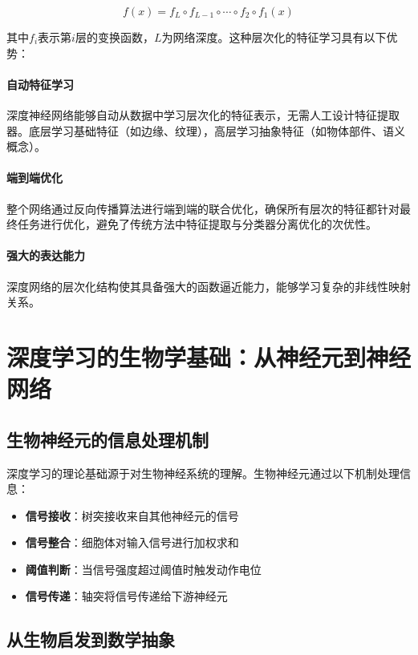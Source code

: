 \begin{equation}
f(x) = f_L \circ f_{L-1} \circ \cdots \circ f_2 \circ f_1(x)
\end{equation}

其中$f_i$表示第$i$层的变换函数，$L$为网络深度。这种层次化的特征学习具有以下优势：

\paragraph{自动特征学习}
深度神经网络能够自动从数据中学习层次化的特征表示，无需人工设计特征提取器。底层学习基础特征（如边缘、纹理），高层学习抽象特征（如物体部件、语义概念）。

\paragraph{端到端优化}
整个网络通过反向传播算法进行端到端的联合优化，确保所有层次的特征都针对最终任务进行优化，避免了传统方法中特征提取与分类器分离优化的次优性。

\paragraph{强大的表达能力}
深度网络的层次化结构使其具备强大的函数逼近能力，能够学习复杂的非线性映射关系。

\section{深度学习的生物学基础：从神经元到神经网络}

\subsection{生物神经元的信息处理机制}

深度学习的理论基础源于对生物神经系统的理解。生物神经元通过以下机制处理信息：

\begin{itemize}
\item {\bf 信号接收}：树突接收来自其他神经元的信号
\item {\bf 信号整合}：细胞体对输入信号进行加权求和
\item {\bf 阈值判断}：当信号强度超过阈值时触发动作电位
\item {\bf 信号传递}：轴突将信号传递给下游神经元
\end{itemize}

\subsection{从生物启发到数学抽象}

